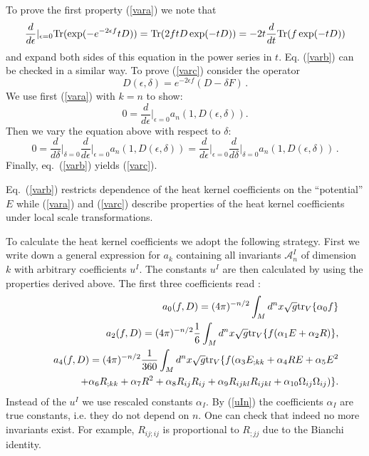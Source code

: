 To prove the first property (\ref{vara}) we note that
\begin{equation}
\frac{d}{d\epsilon} \vert_{\epsilon =0} {\rm Tr}
(\exp (-e^{-2\epsilon f}t D))=
{\rm Tr} (2ftD \exp (-tD)) =-2t\frac {d}{dt}
{\rm Tr} (f\exp (-tD))
\nonumber
\end{equation}
and expand both sides of this equation in the power series in $t$.
Eq.
(\ref{varb}) can be checked in a similar way. To prove (\ref{varc}) consider
the operator
\begin{equation}
D(\epsilon ,\delta )=e^{-2\epsilon f} (D -\delta F)\,.
\end{equation}
We use first (\ref{vara}) with $k=n$ to show:
\begin{equation}
0=\frac{d}{d\epsilon} \vert_{\epsilon =0} a_{n} (1,
D(\epsilon ,\delta )). \end{equation}
Then we vary the equation above with respect to $\delta$:
\begin{equation}
0= \frac{d}{d\delta}\vert_{\delta =0}
\frac{d}{d\epsilon} \vert_{\epsilon =0} a_{n} (1,
D(\epsilon ,\delta ))=\frac{d}{d\epsilon} \vert_{\epsilon =0}
\frac{d}{d\delta}\vert_{\delta =0} a_{n} (1,
D(\epsilon ,\delta ))\,. \end{equation}
Finally, eq.\ (\ref{varb}) yields (\ref{varc}).

Eq.\ (\ref{varb}) restricts dependence of the heat kernel coefficients
on the ``potential'' $E$ while (\ref{vara}) and (\ref{varc}) describe
properties of the heat kernel coefficients under local scale transformations.

To calculate the heat kernel coefficients we adopt the following
strategy. First we write down a general expression for $a_k$
containing all invariants $\mathcal{ A}_n^I$ of dimension $k$ with
arbitrary coefficients $u^I$. The constants $u^I$ are then
calculated by using the properties derived above. The first three
coefficients read \cite{Gilkey1975,Gilkey:1995}:
\begin{eqnarray}
&&a_{0}(f,D)=(4\pi)^{-n/2}\int_M d^nx\sqrt{g} {\rm tr}_V\{\alpha_0 f\} \label{a0gen} \\
&&a_2(f,D)
         =(4\pi)^{-n/2}\frac 16 \int_M d^nx\sqrt{g} {\rm tr}_V\{f(
\alpha_1E+\alpha_2R)\},\label{a2gen}\\
&&   a_4(f,D)=(4\pi)^{-n/2}\frac 1{360} \int_M d^nx\sqrt{g} {\rm tr}_V\{f(\alpha_3E_{;kk}
    +\alpha_4R E+\alpha_5E^2 \nonumber \\
&&\qquad\qquad
    +\alpha_6R_{;kk}+\alpha_7R^2+\alpha_8 R_{ij}R_{ij}
    +\alpha_9 R_{ijkl}R_{ijkl}+\alpha_{10}\Omega_{ ij}\Omega_{ij})\}.
\label{a4gen}
\end{eqnarray}
Instead of the $u^I$ we use rescaled constants $\alpha_I$. By (\ref{uIn})
the coefficients $\alpha_I$ are true constants, i.e. they do not depend on
$n$. One can check that indeed no more invariants exist. For example,
$R_{ij;ij}$ is proportional to $R_{;jj}$ due to the Bianchi identity.



